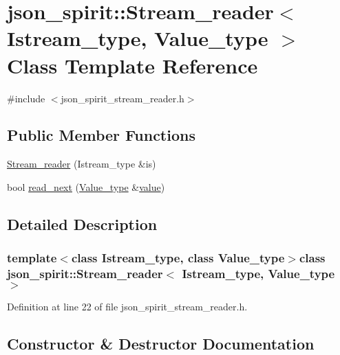 \hypertarget{classjson__spirit_1_1_stream__reader}{}\section{json\+\_\+spirit\+:\+:Stream\+\_\+reader$<$ Istream\+\_\+type, Value\+\_\+type $>$ Class Template Reference}
\label{classjson__spirit_1_1_stream__reader}


{\ttfamily \#include $<$json\+\_\+spirit\+\_\+stream\+\_\+reader.\+h$>$}

\subsection*{Public Member Functions}
\begin{DoxyCompactItemize}
\item 
\hyperlink{classjson__spirit_1_1_stream__reader_a8aca8be9215894693176cd89f2d10091}{Stream\+\_\+reader} (Istream\+\_\+type \&is)
\item 
bool \hyperlink{classjson__spirit_1_1_stream__reader_acd723ec164d87c00088b60bd364a606d}{read\+\_\+next} (\hyperlink{namespacejson__spirit_aeaad57c912e0370a76f60cd510ad3d74}{Value\+\_\+type} \&\hyperlink{cache_8cc_a0f61d63b009d0880a89c843bd50d8d76}{value})
\end{DoxyCompactItemize}


\subsection{Detailed Description}
\subsubsection*{template$<$class Istream\+\_\+type, class Value\+\_\+type$>$class json\+\_\+spirit\+::\+Stream\+\_\+reader$<$ Istream\+\_\+type, Value\+\_\+type $>$}



Definition at line 22 of file json\+\_\+spirit\+\_\+stream\+\_\+reader.\+h.



\subsection{Constructor \& Destructor Documentation}
\hypertarget{classjson__spirit_1_1_stream__reader_a8aca8be9215894693176cd89f2d10091}{}
